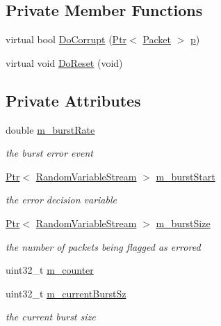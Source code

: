 \subsection*{Private Member Functions}
\begin{DoxyCompactItemize}
\item 
virtual bool \hyperlink{classns3_1_1BurstErrorModel_a42b33011d7c55aa034105b36f7555b6f}{Do\+Corrupt} (\hyperlink{classns3_1_1Ptr}{Ptr}$<$ \hyperlink{classns3_1_1Packet}{Packet} $>$ \hyperlink{lte__link__budget__x2__handover__measures_8m_ac9de518908a968428863f829398a4e62}{p})
\item 
virtual void \hyperlink{classns3_1_1BurstErrorModel_a374a3d2c1cba5e13ed1444349751cd0e}{Do\+Reset} (void)
\end{DoxyCompactItemize}
\subsection*{Private Attributes}
\begin{DoxyCompactItemize}
\item 
double \hyperlink{classns3_1_1BurstErrorModel_aa2e1ae3a457e02d293087e60d9c3e817}{m\+\_\+burst\+Rate}
\begin{DoxyCompactList}\small\item\em the burst error event \end{DoxyCompactList}\item 
\hyperlink{classns3_1_1Ptr}{Ptr}$<$ \hyperlink{classns3_1_1RandomVariableStream}{Random\+Variable\+Stream} $>$ \hyperlink{classns3_1_1BurstErrorModel_a09d02e5eba8d09bb9629441a5de8aa5c}{m\+\_\+burst\+Start}
\begin{DoxyCompactList}\small\item\em the error decision variable \end{DoxyCompactList}\item 
\hyperlink{classns3_1_1Ptr}{Ptr}$<$ \hyperlink{classns3_1_1RandomVariableStream}{Random\+Variable\+Stream} $>$ \hyperlink{classns3_1_1BurstErrorModel_a70535824359d6850824de2dca0435978}{m\+\_\+burst\+Size}
\begin{DoxyCompactList}\small\item\em the number of packets being flagged as errored \end{DoxyCompactList}\item 
uint32\+\_\+t \hyperlink{classns3_1_1BurstErrorModel_ab4f68bc4b8ac8283562386898cb7983e}{m\+\_\+counter}
\item 
uint32\+\_\+t \hyperlink{classns3_1_1BurstErrorModel_a976dfedc746d41733a789f969e25d0a9}{m\+\_\+current\+Burst\+Sz}
\begin{DoxyCompactList}\small\item\em the current burst size \end{DoxyCompactList}\end{DoxyCompactItemize}
